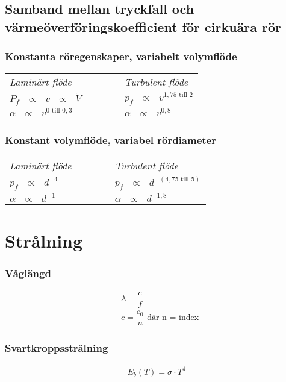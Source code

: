   \subsection*{Samband mellan tryckfall och värmeöverföringskoefficient för cirkuära rör}
\subsubsection*{Konstanta röregenskaper, variabelt volymflöde}
\begin{tabularx}{\linewidth} { l l l}
	\textit{Laminärt flöde} & ~~~~~  & \textit{Turbulent flöde} \\ 
  $P_f \text{ } \propto \text{ } v \text{ } \propto \text{ } \dot{V}$ &&  $p_f \text{ } \propto \text{ } v^{1,75 \text{ till } 2}$\\
  $\alpha \text{ } \propto \text{ } v^{0 \text{ till } 0,3}$ &&  $\alpha \text{ } \propto \text{ } v^{0,8}$\\
	\end{tabularx}
\subsubsection*{Konstant volymflöde, variabel rördiameter}
\begin{tabularx}{\linewidth} {l l l} 
	\textit{Laminärt flöde} & ~~~~~  & \textit{Turbulent flöde} \\ 
	$p_f \text{ } \propto \text{ } d^{-4}$ && $p_f \text{ } \propto \text{ } d^{-(4,75 \text{ till } 5)}$\\
	$\alpha \text{ } \propto \text{ } d^{-1}$ && $\alpha \text{ } \propto \text{ } d^{-1,8}$\\
	\end{tabularx}
\section*{Strålning}
\subsubsection*{Våglängd}
\begin{align*}
	&\lambda = \dfrac{c}{f} \\
	& c = \dfrac{c_{0}}{n} \text{ där n = index}
\end{align*}
\subsubsection*{Svartkroppsstrålning}
\begin{align*}
	E_b(T)=\sigma \cdot T^4
\end{align*}
